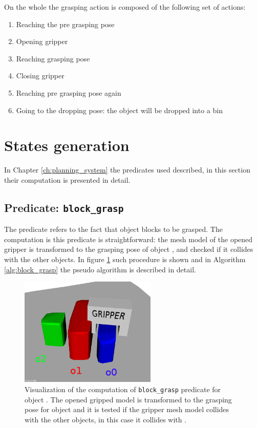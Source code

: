 On the whole the grasping action is composed of the following set of actions: 
\begin{enumerate}
\item Reaching the pre grasping pose
\item Opening gripper
\item Reaching grasping pose
\item Closing gripper
\item Reaching pre grasping pose again
\item Going to the dropping pose: the object will be dropped into a bin
\end{enumerate}

\section{States generation}
In Chapter \ref{ch:planning_system}  the predicates used  described, in this section their computation is presented in detail. 

\subsection{Predicate: \texttt{block\_grasp}}
The  predicate refers to the fact that object  blocks  to be grasped. The computation is this predicate is straightforward: the mesh model of the opened gripper is transformed to the grasping pose of object , and checked if it collides with the other objects. In figure \ref{fig:block_grasp} such procedure is shown and in Algorithm \ref{alg:block_grasp} the pseudo algorithm is described in detail. 

\begin{figure}[tb]
\centering
\includegraphics[width=6.5cm]{Img/grasping/block_grasp.png}
\caption{Visualization of the computation of \texttt{block\_grasp} predicate for object . The opened gripped model is transformed to the grasping pose for object  and it is tested if the gripper mesh model collides with the other objects, in this case it collides with . }\label{fig:block_grasp}
\end{figure}

